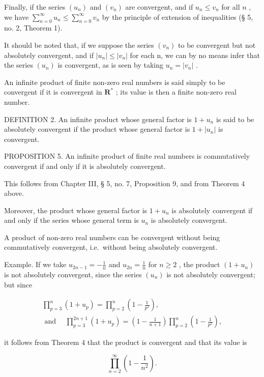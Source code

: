 Finally, if the series \((u_n)\) and \((v_n)\) are convergent, and if \(u_n \leqslant v_n\) for all \(n\) , we have \(\sum_{n=0}^{\infty} u_n \leqslant \sum_{n=0}^{\infty} v_n\) by the principle of extension of inequalities (§ 5, no. 2, Theorem 1).

It should be noted that, if we suppose the series \((v_{n})\) to be convergent but not absolutely convergent, and if \(|u_{n}| \leqslant |v_{n}|\) for each n, we can by no means infer that the series \((u_{n})\) is convergent, as is seen by taking \(u_{n} = |v_{n}|\) .

An infinite product of finite non-zero real numbers is said simply to be convergent if it is convergent in \(\mathbf{R}^*\) ; its value is then a finite non-zero real number.

DEFINITION 2. An infinite product whose general factor is \(1 + u_{n}\) is said to be absolutely convergent if the product whose general factor is \(1 + |u_{n}|\) is convergent.

PROPOSITION 5. An infinite product of finite real numbers is commutatively convergent if and only if it is absolutely convergent.

This follows from Chapter III, § 5, no. 7, Proposition 9, and from Theorem 4 above.

Moreover, the product whose general factor is \(1 + u_{n}\) is absolutely convergent if and only if the series whose general term is \(u_{n}\) is absolutely convergent.

A product of non-zero real numbers can be convergent without being commutatively convergent, i.e.~without being absolutely convergent.

Example. If we take \(u_{2n-1} = -\frac{1}{n}\) and \(u_{2n} = \frac{1}{n}\) for \(n \geqslant 2\) , the product \((1 + u_n)\) is not absolutely convergent, since the series \((u_n)\) is not absolutely convergent; but since

\[
\begin{array}{l} \prod_ {p = 3} ^ {n} (1 + u _ {p}) = \prod_ {p = 2} ^ {n} \left(1 - \frac {1}{p ^ {2}}\right), \\ \text { and } \quad \prod_ {p = 3} ^ {2 n + 1} (1 + u _ {p}) = \left(1 - \frac {1}{n + 1}\right) \prod_ {p = 2} ^ {n} \left(1 - \frac {1}{p ^ {2}}\right), \end{array}
\]

it follows from Theorem 4 that the product is convergent and that its value is

\[
\prod_ {n = 2} ^ {\infty} \left(1 - \frac {1}{n ^ {2}}\right).
\]


